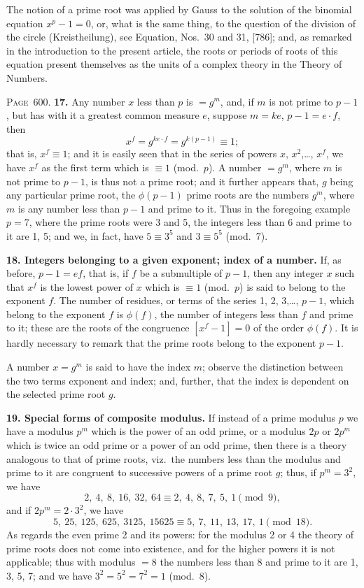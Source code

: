 \documentclass[11pt,a4paper]{book}
\begin{document}
The notion of a prime root was applied by Gauss to the solution of the binomial equation $x^p-1=0$, or, what is the same thing, to the question of the division of the circle (Kreistheilung), see Equation, Nos.~30 and 31, [786]; and, as remarked in the introduction to the present article, the roots or periods of roots of this equation present themselves as the units of a complex theory in the Theory of Numbers.

\newpage
\noindent\textsc{Page~600.} \textbf{17.} Any number $x$ less than $p$ is $=g^m$, and, if $m$ is not prime to $p-1$, but has with it a greatest common measure $e$, suppose $m=ke$, $p-1=e\cdot f$, then
\[
x^f=g^{ke\cdot f}=g^{k(p-1)}\equiv1;
\]
that is, $x^f\equiv1$; and it is easily seen that in the series of powers $x$, $x^2$,\ldots, $x^f$, we have $x^f$ as the first term which is $\equiv1$ (mod.\ $p$). A number $=g^m$, where $m$ is not prime to $p-1$, is thus not a prime root; and it further appears that, $g$ being any particular prime root, the $\phi(p-1)$ prime roots are the numbers $g^m$, where $m$ is any number less than $p-1$ and prime to it. Thus in the foregoing example $p=7$, where the prime roots were 3 and 5, the integers less than 6 and prime to it are 1, 5; and we, in fact, have $5\equiv3^5$ and $3\equiv5^5$ (mod.\ 7).

\textbf{18. Integers belonging to a given exponent; index of a number.} If, as before, $p-1=ef$, that is, if $f$ be a submultiple of $p-1$, then any integer $x$ such that $x^f$ is the lowest power of $x$ which is $\equiv1$ (mod.\ $p$) is said to belong to the exponent $f$. The number of residues, or terms of the series 1, 2, 3,\ldots, $p-1$, which belong to the exponent $f$ is $\phi(f)$, the number of integers less than $f$ and prime to it; these are the roots of the congruence $[x^f-1]=0$ of the order $\phi(f)$. It is hardly necessary to remark that the prime roots belong to the exponent $p-1$.

A number $x=g^m$ is said to have the index $m$; observe the distinction between the two terms exponent and index; and, further, that the index is dependent on the selected prime root $g$.

\textbf{19. Special forms of composite modulus.} If instead of a prime modulus $p$ we have a modulus $p^m$ which is the power of an odd prime, or a modulus $2p$ or $2p^m$ which is twice an odd prime or a power of an odd prime, then there is a theory analogous to that of prime roots, viz.\ the numbers less than the modulus and prime to it are congruent to successive powers of a prime root $g$; thus, if $p^m=3^2$, we have
\[
2,\ 4,\ 8,\ 16,\ 32,\ 64\equiv2,\ 4,\ 8,\ 7,\ 5,\ 1\pmod{9},
\]
and if $2p^m=2\cdot3^2$, we have
\[
5,\ 25,\ 125,\ 625,\ 3125,\ 15625\equiv5,\ 7,\ 11,\ 13,\ 17,\ 1\pmod{18}.
\]
As regards the even prime 2 and its powers: for the modulus 2 or 4 the theory of prime roots does not come into existence, and for the higher powers it is not applicable; thus with modulus $=8$ the numbers less than 8 and prime to it are 1, 3, 5, 7; and we have $3^2=5^2=7^2=1$ (mod.\ 8).
\end{document}
